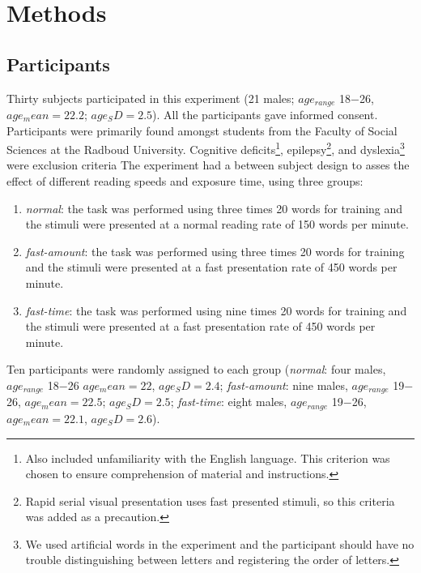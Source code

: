 \section{Methods}
\label{sec:method}

\subsection{Participants}
Thirty subjects participated in this experiment (21 males; $age_{range}$ 18$-$26, $age_mean=22.2$; $age_SD=2.5$). All the participants gave informed consent.\\
Participants were primarily found amongst students from the Faculty of Social Sciences at the Radboud University. Cognitive deficits\footnote{Also included unfamiliarity with the English language. This criterion was chosen to ensure comprehension of material and instructions.}, epilepsy\footnote{Rapid serial visual presentation uses fast presented stimuli, so this criteria was added as a precaution.}, and dyslexia\footnote{We used artificial words in the experiment and the participant should have no trouble distinguishing between letters and registering the order of letters.} were exclusion criteria
The experiment had a between subject design to asses the effect of different reading speeds and exposure time, using three groups:
\begin{enumerate}
	\item \textit{normal}: the task was performed using three times 20 words for training and the stimuli were presented at a normal reading rate of 150 words per minute.
	\item \textit{fast-amount}: the task was performed using three times 20 words for training and the stimuli were presented at a fast presentation rate of 450 words per minute.
	\item \textit{fast-time}: the task was performed using nine times 20 words for training and the stimuli were presented at a fast presentation rate of 450 words per minute.
\end{enumerate}
Ten participants were randomly assigned to each group (\textit{normal}: four males, $age_{range}$ 18$-$26 $age_mean=22$, $age_SD=2.4$; \textit{fast-amount}: nine males, $age_{range}$ 19$-$26, $age_mean=22.5$; $age_SD=2.5$; \textit{fast-time}: eight males, $age_{range}$ 19$-$26, $age_mean=22.1$, $age_SD=2.6$).\\

